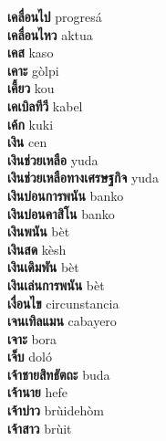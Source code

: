 \textbf{ เคลื่อนไป  } progresá \\
\textbf{ เคลื่อนไหว  } aktua \\
\textbf{ เคส  } kaso \\
\textbf{ เคาะ  } gòlpi \\
\textbf{ เคี้ยว  } kou \\
\textbf{ เคเบิลทีวี  } kabel \\
\textbf{ เค้ก  } kuki \\
\textbf{ เงิน  } cen \\
\textbf{ เงินช่วยเหลือ  } yuda \\
\textbf{ เงินช่วยเหลือทางเศรษฐกิจ  } yuda \\
\textbf{ เงินบ่อนการพนัน  } banko \\
\textbf{ เงินบ่อนคาสิโน  } banko \\
\textbf{ เงินพนัน  } bèt \\
\textbf{ เงินสด  } kèsh \\
\textbf{ เงินเดิมพัน  } bèt \\
\textbf{ เงินเล่นการพนัน  } bèt \\
\textbf{ เงื่อนไข  } circunstancia \\
\textbf{ เจนเทิลแมน  } cabayero \\
\textbf{ เจาะ  } bora \\
\textbf{ เจ็บ  } doló \\
\textbf{ เจ้าชายสิทธัตถะ  } buda \\
\textbf{ เจ้านาย  } hefe \\
\textbf{ เจ้าบ่าว  } brùidehòm \\
\textbf{ เจ้าสาว  } brùit \\
